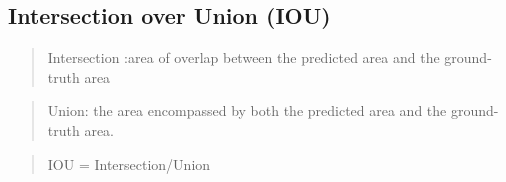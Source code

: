 \documentclass[11pt]{article}
\begin{document}
\subsection{Intersection over Union
(IOU)}\label{intersection-over-union-iou}

\begin{quote}
Intersection :area of overlap between the predicted area and the
ground-truth area
\end{quote}

\begin{quote}
Union: the area encompassed by both the predicted area and the
ground-truth area.
\end{quote}

\begin{quote}
IOU = Intersection/Union
\end{quote}
\end{document}
